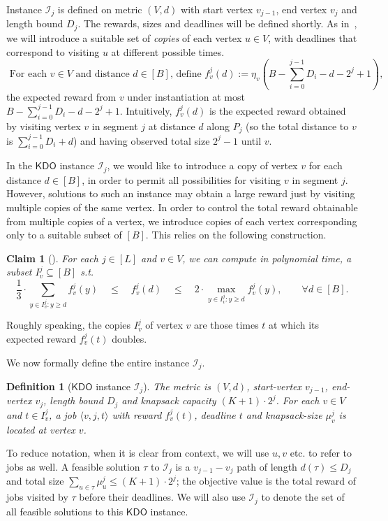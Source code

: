 \documentclass[11pt,letterpaper]{article}
\newtheorem{definition}[theorem]{Definition}
\newtheorem{claim}[theorem]{Claim}
\numberwithin{algorithm}{section}
\newcommand{\sse}{\subseteq}
\newcommand{\I}{{\mathcal{I}}}
\newcommand{\kdo}{\ensuremath{\mathsf{KDO}}\xspace}
\begin{document}
Instance $\I_j$ is defined on metric $(V,d)$ with start vertex $v_{j-1}$, end vertex $v_j$ and length bound $D_j$. The rewards, sizes and deadlines will be defined shortly. As in~\cite{GKNR12}, we will introduce a suitable set of {\em copies} of each vertex $u\in V$, with deadlines that correspond to visiting $u$ at different possible times.
\begin{equation}\label{eq:kdo-copies}
\mbox{ For each $v\in V$ and distance $d\in [B]$, define $f_{v}^j(d):=\eta_v(B-\sum_{i=0}^{j-1}D_i-d-2^j+1)$, }
\end{equation} the expected reward from $v$ under instantiation at most $B-\sum_{i=0}^{j-1}D_i-d-2^j+1$. Intuitively, $f^j_v(d)$ is the expected reward obtained by visiting vertex $v$ in segment $j$ at distance $d$ along $P_j$ (so the total distance to $v$ is $\sum_{i=0}^{j-1}D_i+d$) and having observed total size $2^j-1$ until $v$.

In the \kdo instance $\I_j$, we would like to introduce a copy of vertex $v$ for each distance $d\in [B]$, in order to permit all possibilities for visiting $v$ in segment $j$.
However, solutions to such an instance may obtain a large reward just by visiting multiple copies of the same vertex. In order to control the total reward obtainable from multiple copies of a vertex, we introduce copies of each vertex corresponding only to a suitable subset of $[B]$. This relies on the following construction.
\begin{claim}[\cite{GKNR12}] \label{cl:gknr-count}
For each $j\in[L]$ and $v\in V$, we can compute in polynomial time, a subset $I^j_v\sse [B]$ s.t.
$$\frac{1}{3}\cdot \sum_{y\in I^j_v:y\ge d} f^j_v(y) \quad \le \quad f^j_v(d) \quad \le \quad 2\cdot \max_{y\in I^j_v:y\ge d} f^j_v(y),\qquad \forall d\in[B].$$
\end{claim}
Roughly speaking, the copies $I^j_v$ of vertex $v$ are those times $t$ at which its expected reward $f^j_v(t)$ doubles.

We now formally define the entire instance $\I_j$.
\begin{definition}[\kdo instance $\I_j$]
The metric is $(V,d)$, start-vertex $v_{j-1}$, end-vertex $v_j$, length bound $D_j$ and knapsack capacity $(K+1)\cdot 2^j$. For each $v\in V$ and $t\in I^j_v$, a job $\langle v, j, t\rangle$ with reward $f^j_v(t)$, deadline $t$ and knapsack-size $\mu^j_v$ is located at vertex $v$.
\end{definition}

To reduce notation, when it is clear from context, we will use $u,v$ etc. to refer to jobs as well. A feasible solution $\tau$ to $\I_j$ is a $v_{j-1}-v_j$ path of length $d(\tau)\le D_j$ and total size $\sum_{u\in \tau} \mu^j_u \le (K+1)\cdot 2^j$; the objective value is the total reward of jobs visited by $\tau$ before their deadlines. We will also use $\I_j$ to denote the set of all feasible solutions to this \kdo instance.
\end{document}
